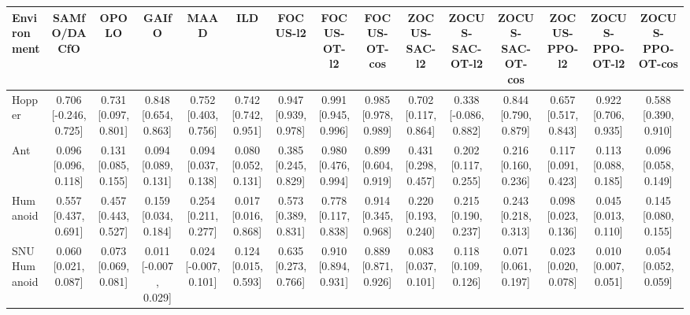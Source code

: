 \begin{tabular}{lcccccccccccccc}
\toprule
Environment & SAMfO/DACfO & OPOLO & GAIfO & MAAD & ILD & FOCUS-l2 & FOCUS-OT-l2 & FOCUS-OT-cos & ZOCUS-SAC-l2 & ZOCUS-SAC-OT-l2 & ZOCUS-SAC-OT-cos & ZOCUS-PPO-l2 & ZOCUS-PPO-OT-l2 & ZOCUS-PPO-OT-cos \\
\midrule
Hopper & 0.706 [-0.246, 0.725] & 0.731 [0.097, 0.801] & 0.848 [0.654, 0.863] & 0.752 [0.403, 0.756] & 0.742 [0.742, 0.951] & 0.947 [0.939, 0.978] & 0.991 [0.945, 0.996] & 0.985 [0.978, 0.989] & 0.702 [0.117, 0.864] & 0.338 [-0.086, 0.882] & 0.844 [0.790, 0.879] & 0.657 [0.517, 0.843] & 0.922 [0.706, 0.935] & 0.588 [0.390, 0.910] \\
Ant & 0.096 [0.096, 0.118] & 0.131 [0.085, 0.155] & 0.094 [0.089, 0.131] & 0.094 [0.037, 0.138] & 0.080 [0.052, 0.131] & 0.385 [0.245, 0.829] & 0.980 [0.476, 0.994] & 0.899 [0.604, 0.919] & 0.431 [0.298, 0.457] & 0.202 [0.117, 0.255] & 0.216 [0.160, 0.236] & 0.117 [0.091, 0.423] & 0.113 [0.088, 0.185] & 0.096 [0.058, 0.149] \\
Humanoid & 0.557 [0.437, 0.691] & 0.457 [0.443, 0.527] & 0.159 [0.034, 0.184] & 0.254 [0.211, 0.277] & 0.017 [0.016, 0.868] & 0.573 [0.389, 0.831] & 0.778 [0.117, 0.838] & 0.914 [0.345, 0.968] & 0.220 [0.193, 0.240] & 0.215 [0.190, 0.237] & 0.243 [0.218, 0.313] & 0.098 [0.023, 0.136] & 0.045 [0.013, 0.110] & 0.145 [0.080, 0.155] \\
SNU Humanoid & 0.060 [0.021, 0.087] & 0.073 [0.069, 0.081] & 0.011 [-0.007, 0.029] & 0.024 [-0.007, 0.101] & 0.124 [0.015, 0.593] & 0.635 [0.273, 0.766] & 0.910 [0.894, 0.931] & 0.889 [0.871, 0.926] & 0.083 [0.037, 0.101] & 0.118 [0.109, 0.126] & 0.071 [0.061, 0.197] & 0.023 [0.020, 0.078] & 0.010 [0.007, 0.051] & 0.054 [0.052, 0.059] \\
\bottomrule
\end{tabular}

